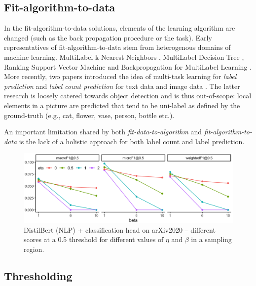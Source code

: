 \subsection{Fit-algorithm-to-data}
In the fit-algorithm-to-data solutions, elements of the learning
algorithm are changed (such as the back propagation procedure or the task).
Early representatives of fit-algorithm-to-data stem from heterogenous domains
of machine learning. MultiLabel k-Nearest Neighbors \cite{ML-KNN},
MultiLabel Decision Tree \cite{ML-DT}, Ranking Support Vector Machine
\cite{multilabelSVM} and Backpropagation for MultiLabel Learning
\cite{multilabelBackprop}. More recently, two papers introduced the idea of
multi-task learning for \emph{label prediction} and \emph{label count
prediction} for text data \cite[ML\(_{\text{NET}}\)][]{multitaskLabel} and image
data \cite{multitaskLabelImages, tencent}. The latter research is loosely
catered towards object detection and is thus out-of-scope: local elements in a picture are predicted that tend to be uni-label as defined by the ground-truth (e.g., cat, flower, vase, person, bottle
etc.).

An important limitation shared by both \emph{fit-data-to-algorithm} and \emph{fit-algorithm-to-data} is the lack of a holistic approach for both label count and label prediction.

\begin{figure}[t!]
\centering
\includegraphics[width=.8\linewidth]{./images/betaEtaResized.png}
\vspace{.5\baselineskip}
\caption{\label{fig:betaEta}
DistilBert (NLP) + classification head on arXiv2020 – different scores at a 0.5 threshold for different values of $\eta$ and $\beta$ in a sampling region.}
\end{figure}

\subsection{Thresholding}
\label{subsec:thresh}

